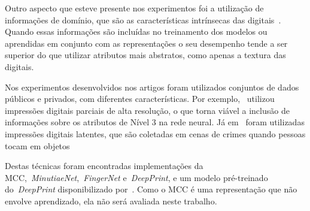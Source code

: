 Outro aspecto que esteve presente nos experimentos foi a utilização de informações de domínio, que são as características intrínsecas das digitais~\cite{handbook_of_fp_recognition}. Quando essas informações são incluídas no treinamento dos modelos ou aprendidas em conjunto com as representações o seu desempenho tende a ser superior do que utilizar atributos mais abstratos, como apenas a textura das digitais.

Nos experimentos desenvolvidos nos artigos foram utilizados conjuntos de dados públicos e privados, com diferentes características. Por exemplo,~ utilizou impressões digitais parciais de alta resolução, o que torna viável a inclusão de informações sobre os atributos de Nível 3 na rede neural. Já em~\cite{fcn} foram utilizadas impressões digitais latentes, que são coletadas em cenas de crimes quando pessoas tocam em objetos~\cite{handbook_of_fp_recognition}

Destas técnicas foram encontradas implementações da MCC,~\textit{MinutiaeNet},~\textit{FingerNet} e~\textit{DeepPrint}, e um modelo pré-treinado do~\textit{DeepPrint} disponibilizado por~. Como o MCC é uma representação que não envolve aprendizado, ela não será avaliada neste trabalho.